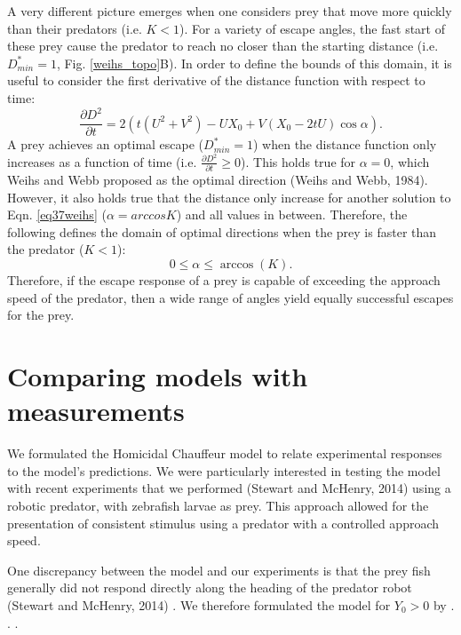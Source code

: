 \documentclass[12pt]{article}
\def\d{\partial}
\begin{document}
A very different picture emerges when one considers prey that move more quickly than their predators (i.e. $K<1$). For a variety of escape angles, the fast start of these prey cause the predator to reach no closer than the starting distance (i.e. $D_{min}^*=1$, Fig. \ref{weihs_topo}B). In order to define the bounds of this domain, it is useful to consider the first derivative of the distance function with respect to time:
%
\begin{equation}
\frac{\d D^2}{\d t}= 2(t(U^2+V^2) - UX_0 + V(X_0-2tU)\cos\alpha).
\label{distderivative}
\end{equation}  
%
A prey achieves an optimal escape ($D_{min}^*=1$) when the distance function only increases as a function of time (i.e. $\frac{\d D^2}{\d t}\geq0$). This holds true for $\alpha=0$, which Weihs and Webb proposed as the optimal direction (Weihs and Webb, 1984). However, it also holds true that the distance only increase for another solution to Eqn. \ref{eq37weihs} ($\alpha=arccos K$) and all values in between. Therefore, the following defines the domain of optimal directions when the prey is faster than the predator ($K<1$):
%
\begin{equation}
0 \leq \alpha \leq \arccos(K).
\label{anglerange}
\end{equation}
%
Therefore, if the escape response of a prey is capable of exceeding the approach speed of the predator, then a wide range of angles yield equally successful escapes for the prey.


\section{Comparing models with measurements}

We formulated the Homicidal Chauffeur model to relate experimental responses to the model's predictions. We were particularly interested in testing the model with recent experiments that we performed (Stewart and McHenry, 2014) using a robotic predator, with zebrafish larvae as prey. This approach allowed for the presentation of consistent stimulus using a predator with a controlled approach speed. 

One discrepancy between the model and our experiments is that the prey fish generally did not respond directly along the heading of the predator robot (Stewart and McHenry, 2014) . We therefore formulated the model for $Y_0>0$ by  . . .
\end{document}
